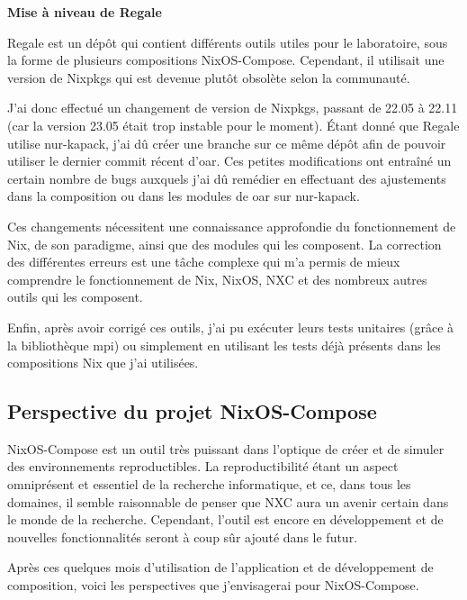 \documentclass[a4paper,french,12pt, titlepage]{article}
\begin{document}
\textbf{Mise à niveau de Regale}\newline

Regale est un dépôt qui contient différents outils utiles pour le
laboratoire, sous la forme de plusieurs compositions NixOS-Compose.
Cependant, il utilisait une version de Nixpkgs qui est devenue plutôt
obsolète selon la communauté.\newline

J'ai donc effectué un changement de version de Nixpkgs, passant de 22.05
à 22.11 (car la version 23.05 était trop instable pour le moment). Étant
donné que Regale utilise nur-kapack, j'ai dû créer une branche sur ce
même dépôt afin de pouvoir utiliser le dernier commit récent d'oar. Ces
petites modifications ont entraîné un certain nombre de bugs auxquels
j'ai dû remédier en effectuant des ajustements dans la composition ou
dans les modules de oar sur nur-kapack.\newline

Ces changements nécessitent une connaissance approfondie du
fonctionnement de Nix, de son paradigme, ainsi que des modules qui les
composent. La correction des différentes erreurs est une tâche complexe
qui m'a permis de mieux comprendre le fonctionnement de Nix, NixOS, NXC
et des nombreux autres outils qui les composent.\newline

Enfin, après avoir corrigé ces outils, j'ai pu exécuter leurs tests
unitaires (grâce à la bibliothèque mpi) ou simplement en utilisant les
tests déjà présents dans les compositions Nix que j'ai utilisées.

\newpage

\hypertarget{perspective-du-projet-nixos-compose}{%
\subsection{Perspective du projet
NixOS-Compose}\label{perspective-du-projet-nixos-compose}}

NixOS-Compose est un outil très puissant dans l'optique de créer et de
simuler des environnements reproductibles. La reproductibilité étant un
aspect omniprésent et essentiel de la recherche informatique, et ce,
dans tous les domaines, il semble raisonnable de penser que NXC aura un
avenir certain dans le monde de la recherche. Cependant, l'outil est
encore en développement et de nouvelles fonctionnalités seront à coup
sûr ajouté dans le futur.

Après ces quelques mois d'utilisation de l'application et de
développement de composition, voici les perspectives que j'envisagerai
pour NixOS-Compose.\newline
\end{document}
